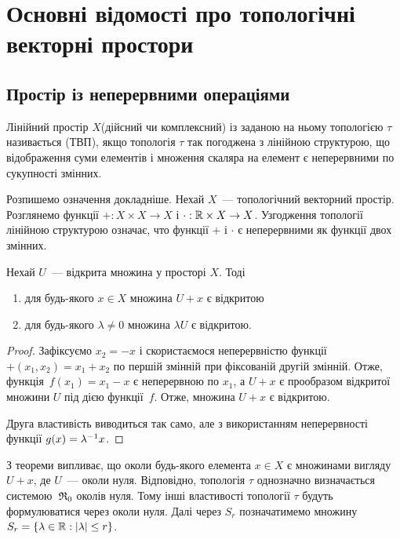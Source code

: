 \newcommand{\AdditionFunction}{+}
\newcommand{\MultiplicationFunction}{\cdot}

\chapter{Основні відомості про топологічні векторні простори}

\section{Простір із неперервними операціями}

\begin{definition}
    Лінійний простір $X$(дійсний чи комплексний) із заданою на ньому топологією $\tau$ називається (ТВП), якщо топологія $\tau$ так погоджена з лінійною структурою, що відображення суми елементів і множення скаляра на елемент є неперервними по сукупності змінних.
\end{definition}

Розпишемо означення докладніше. Нехай $X$~--- топологічний векторний простір. Розглянемо функції $\AdditionFunction: X \times X \to X$ і $\MultiplicationFunction: \RR \times X \to X$. Узгодження топології лінійною структурою означає, что функції $+$ і $\cdot$ є неперервними як функції двох змінних.

\begin{theorem}
    Нехай $U$~--- відкрита множина у просторі $X$. Тоді
    \begin{enumerate}
        \item для будь-якого $x \in X$ множина $U + x$ є відкритою
        \item для будь-якого $\lambda \ne 0$ множина $\lambda U$ є відкритою.
    \end{enumerate}
\end{theorem}

\begin{proof}
    Зафіксуємо $x_2 = -x$ і скористаємося неперервністю функції~$\AdditionFunction(x_1, x_2) = x_1 + x_2$ по першій змінній при фіксованій другій змінній. Отже, функція~$f(x_1) = x_1 - x$ є неперервною по $x_1$, а $U + x$ є прообразом відкритої множини $U$ під дією функції~$f$. Отже, множина $U + x$ є відкритою.

    Друга властивість виводиться так само, але з використанням неперервності функції $g(x) = \lambda\inv x$.
\end{proof}

З теореми випливає, що околи будь-якого елемента $x \in X$ є множинами вигляду~$U + x$, де $U$~--- околи нуля. Відповідно, топологія $\tau$ однозначно визначається системою~$\frak R_0$ околів нуля. Тому інші властивості топології $\tau$ будуть формулюватися через околи нуля. Далі через $S_r$ позначатимемо множину $S_r = \{\lambda \in \RR: |\lambda| \le r\}$.

